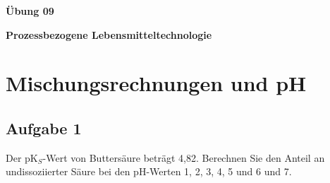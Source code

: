 \documentclass[a4paper,11pt]{article}
\newif\ifshowme
\begin{document}


\bckgrnd


\begin{center}
\LARGE
\color{white}
\textbf{Übung 09} \par \vspace*{2mm}
\large \color{miugray} \textbf{Prozessbezogene Lebensmitteltechnologie}
\end{center}
\par 
\vspace*{6mm}


\color{miudiutex}
\section*{Mischungsrechnungen und pH}
 
 
\subsection*{Aufgabe 1}
Der pK$_S$-Wert von Buttersäure beträgt 4,82.
 Berechnen Sie den Anteil an undissoziierter Säure bei den pH-Werten 1, 2, 3, 4, 5 und 6 und 7.


\ifshowme
\antwort{

\begin{align*}
K_S &= \frac{[H_3O^+] \cdot [A^-]}{[HA]}  \\
pK_S &= -\log K_S \\
pH &= -\log [H_3O^+]
\end{align*}
Henderson-Hasselbalch:
\begin{align*}
pK_S &= pH -\log(\frac{[A^-]}{HA}) \\
 &= -\log [H_3O^+] -\log(\frac{[A^-]}{HA})
\end{align*}
Umstellen:
\begin{align*}
pH - pK_S &= \log(\frac{[A^-]}{HA}) & | 10^x \\
10^{pH - pK_S} &= \frac{[A^-]}{HA} \\
	&~\hat{=}~ \frac{1 - [HA]}{HA} \\
	&~\hat{=}~ \frac{1}{HA} - \frac{[HA]}{HA} \\
	&~\hat{=}~ \frac{1}{HA} - 1 \\
\\
10^{pH - pK_S}	&~\hat{=}~ \frac{1}{HA} - 1 \\
10^{pH - pK_S} +1 &= \frac{1}{HA} \\ \\
HA &= \frac{1}{10^{pH - pK_S} + 1 }
\end{align*}
Nachdem Einsetzen von pK$_S$ und pH-Wert erhält man folgende Ergebnisse: \pp
pH 1 \RA 99,985\% \par pH 2 \RA 99,85\% \par pH 3 \RA 98,5\% \par pH 4 \RA 86,9\% \par pH 5 \RA 39,8\% \par pH 6 \RA 6,2\% \par pH 7 \RA 0,656\%
}
\else
\fi
\end{document}
